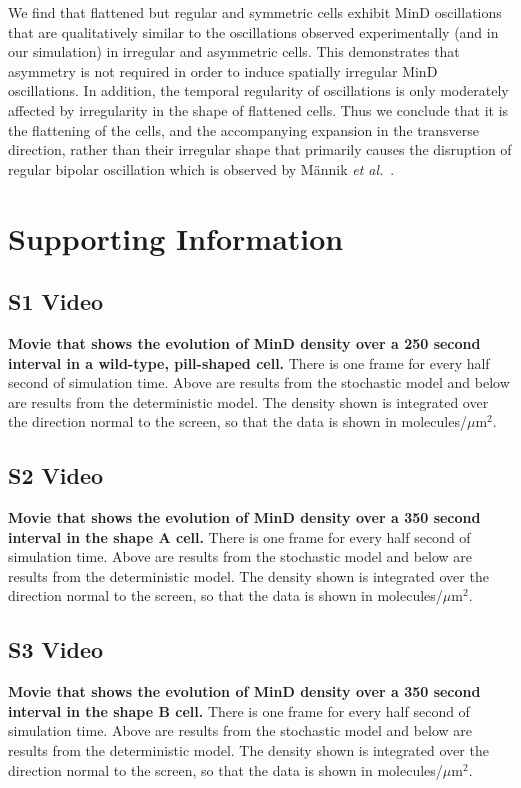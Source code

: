 \documentclass[10pt,letterpaper]{article}
\newcommand\micron{\ensuremath{\mu\text{m}}}
\begin{document}
We find that flattened but regular and symmetric cells exhibit MinD
oscillations that are qualitatively similar to the oscillations
observed experimentally (and in our simulation) in irregular and
asymmetric cells.  This demonstrates that asymmetry is not required in
order to induce spatially irregular MinD oscillations.  In addition,
the temporal regularity of oscillations is only moderately affected by
irregularity in the shape of flattened cells.  Thus we conclude that
it is the flattening of the cells, and the accompanying expansion in the
transverse direction, rather than their irregular shape that primarily
causes the disruption of regular bipolar oscillation which is observed
by M\"annik \emph{et al.}~\cite{mannik2012robustness}.


\section*{Supporting Information}

\subsection*{S1 Video}
\label{movie-MinD-density-pill}
{\bf Movie that shows the evolution of MinD density over a 250 second
  interval in a wild-type, pill-shaped cell.}  There is one frame for
every half second of simulation time. Above are results from the
stochastic model and below are results from the deterministic model.
The density shown is integrated over the direction normal to the
screen, so that the data is shown in molecules/$\micron^2$.

\subsection*{S2 Video}
\label{movie-MinD-density-shape-A}
{\bf Movie that shows the evolution of MinD density over a 350 second
  interval in the shape A cell.}  There is one frame for every half
second of simulation time. Above are results from the stochastic model
and below are results from the deterministic model.  The density shown
is integrated over the direction normal to the screen, so that the
data is shown in molecules/$\micron^2$.

\subsection*{S3 Video}
\label{movie-MinD-density-shape-B}
{\bf Movie that shows the evolution of MinD density over a 350 second
  interval in the shape B cell.}  There is one frame for every half
second of simulation time. Above are results from the stochastic model
and below are results from the deterministic model.  The density shown
is integrated over the direction normal to the screen, so that the
data is shown in molecules/$\micron^2$.
\end{document}
